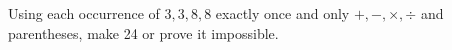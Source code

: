 Using each occurrence of $3,3,8,8$ exactly once and only $+,-,\times,\div$ and parentheses, make 24 or prove it impossible.
